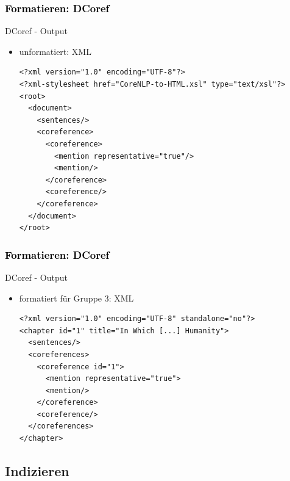 \documentclass[xcolor=dvipsnames]{beamer}
\begin{document}

\begin{frame}[fragile]\frametitle{\textcolor{black}{Formatieren: DCoref}}

\begin{block}{DCoref - Output}
\begin{itemize}
\item unformatiert: XML
\begin{small}\begin{verbatim}
<?xml version="1.0" encoding="UTF-8"?>
<?xml-stylesheet href="CoreNLP-to-HTML.xsl" type="text/xsl"?>
<root>
  <document>
    <sentences/>
    <coreference>
      <coreference>
        <mention representative="true"/>
        <mention/>
      </coreference>
      <coreference/>
    </coreference>
  </document>
</root>
\end{verbatim}
\end{small}
\end{itemize}
\end{block}

\end{frame}


\begin{frame}[fragile]\frametitle{\textcolor{black}{Formatieren: DCoref}}

\begin{block}{DCoref - Output}
\begin{itemize}
\item formatiert für Gruppe 3: XML
\begin{small}\begin{verbatim}
<?xml version="1.0" encoding="UTF-8" standalone="no"?>
<chapter id="1" title="In Which [...] Humanity">
  <sentences/>
  <coreferences>
    <coreference id="1">
      <mention representative="true">
      <mention/>
    </coreference>
    <coreference/>
  </coreferences>
</chapter>
\end{verbatim}
\end{small}
\end{itemize}
\end{block}

\end{frame}



\subsection{Indizieren}
\end{document}
